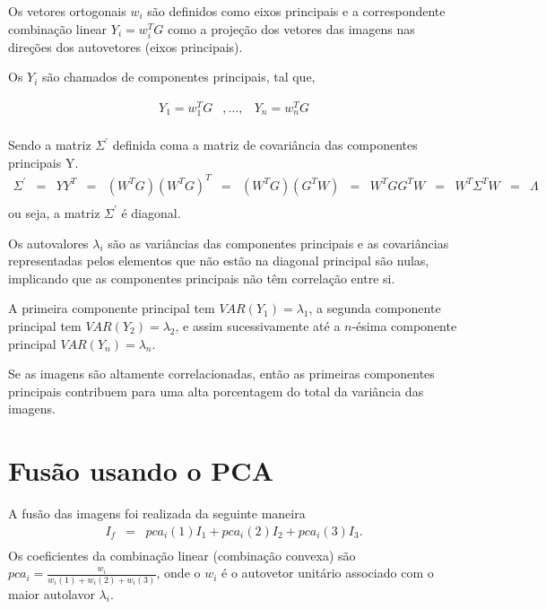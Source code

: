 Os vetores ortogonais $w_i$ são definidos como eixos principais e a correspondente combinação linear $Y_i=w_i^TG$ como a projeção dos vetores das imagens nas direções dos autovetores (eixos principais).

Os $Y_i$ são chamados de componentes principais, tal que,

\begin{equation*}
\begin{aligned}
Y_1=w_1^TG&,\ldots, &Y_n=w_n^TG \\
\end{aligned}
\end{equation*}

Sendo a matriz $\Sigma^{'}$ definida coma a matriz de covariância das componentes principais $\mathrm{Y}$.
\begin{equation*}
\begin{aligned}
	\Sigma^{'}&= &YY^T&=&(W^TG)(W^TG)^T&=&(W^TG)(G^TW)&=&W^TGG^TW&=&W^T\Sigma^TW&=&\Lambda\\
\end{aligned}
\end{equation*}
ou seja, a matriz $\Sigma^{'}$ é diagonal.

Os autovalores $\lambda_i$ são as variâncias das componentes principais e as covariâncias representadas pelos elementos que não estão na diagonal principal são nulas, implicando que as componentes principais não têm correlação entre si.

A primeira componente principal tem $VAR(Y_1)=\lambda_1$, a segunda componente principal tem $VAR(Y_2)=\lambda_2$, e assim sucessivamente até a $n$-ésima componente principal $VAR(Y_n)=\lambda_n$. 

Se as imagens são altamente correlacionadas, então as primeiras componentes principais contribuem para uma alta porcentagem do total da variância das imagens.

\section{Fusão usando o PCA}
A fusão das imagens foi realizada da seguinte maneira 
\begin{equation*}
\begin{aligned}
	I_f&=&pca_i(1) I_1 + pca_i(2) I_2 + pca_i(3) I_3. \\
\end{aligned}
\end{equation*}
 Os coeficientes da combinação linear (combinação convexa) são $pca_i=\frac{w_i}{w_i(1)+w_i(2)+w_i(3)}$, onde o $w_i$ é o autovetor unitário associado com o maior autolavor $\lambda_i$.

